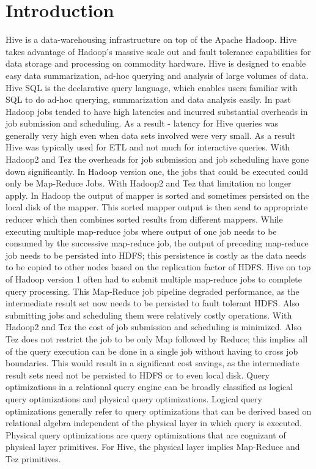 \documentclass{vldb}
\begin{document}
\section{Introduction}
Hive is a data-warehousing infrastructure on top of the Apache Hadoop. 
Hive takes advantage of Hadoop’s massive scale out and fault tolerance capabilities for data storage and processing on commodity hardware. Hive is designed to enable easy data summarization, ad-hoc querying and analysis of large volumes of data. Hive SQL is the declarative query language, which enables users familiar with SQL to do ad-hoc querying, summarization and data analysis easily.
In past Hadoop jobs tended to have high latencies and incurred substantial overheads in job submission and scheduling. As a result - latency for Hive queries was generally very high even when data sets involved were very small. As a result Hive was typically used for ETL and not much for interactive queries. With Hadoop2 and Tez the overheads for job submission and job scheduling have gone down significantly. In Hadoop version one, the jobs that could be executed could only be Map-Reduce Jobs. With Hadoop2 and Tez that limitation no longer apply.
In Hadoop the output of mapper is sorted and sometimes persisted on the local disk of the mapper. This sorted mapper output is then send to appropriate reducer which then combines sorted results from different mappers. While executing multiple map-reduce jobs where output of one job needs to be consumed by the successive map-reduce job, the output of preceding map-reduce job needs to be persisted into HDFS; this persistence is costly as the data needs to be copied to other nodes based on the replication factor of HDFS.
Hive on top of Hadoop version 1 often had to submit multiple map-reduce jobs to complete query processing. This Map-Reduce job pipeline degraded performance, as the intermediate result set now needs to be persisted to fault tolerant HDFS. Also submitting jobs and scheduling them were relatively costly operations. With Hadoop2 and Tez the cost of job submission and scheduling is minimized. Also Tez does not restrict the job to be only Map followed by Reduce; this implies all of the query execution can be done in a single job without having to cross job boundaries. This would result in a significant cost savings, as the intermediate result sets need not be persisted to HDFS or to even local disk.
Query optimizations in a relational query engine can be broadly classified as logical query optimizations and physical query optimizations. Logical query optimizations generally refer to query optimizations that can be derived based on relational algebra independent of the physical layer in which query is executed. Physical query optimizations are query optimizations that are cognizant of physical layer primitives. For Hive, the physical layer implies Map-Reduce and Tez primitives.
\end{document}

